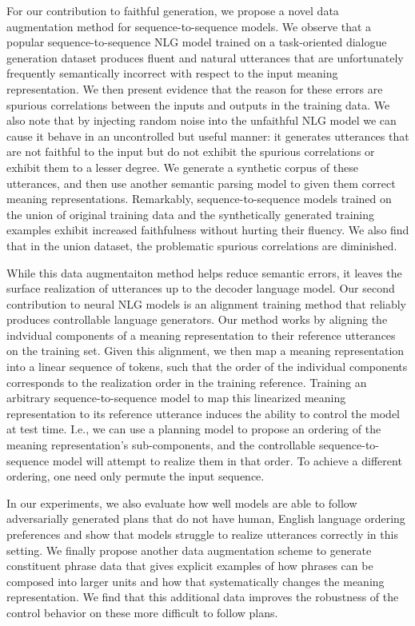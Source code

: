       
For our contribution to faithful generation, we propose a novel data
augmentation method for sequence-to-sequence models.  We observe that a
popular sequence-to-sequence NLG model trained on a task-oriented dialogue
generation dataset produces fluent and natural utterances that are
unfortunately frequently semantically incorrect with respect to the input
meaning representation.  We then present evidence that the reason for these
errors are spurious correlations between the inputs and outputs in the
training data.  We also note that by injecting random noise into the
unfaithful NLG model we can cause it behave in an uncontrolled but useful
manner: it generates utterances that are not faithful to the input but do not
exhibit the spurious correlations or exhibit them to a lesser degree.  We
generate a synthetic corpus of these utterances, and then use another semantic
parsing model to given them correct meaning representations.  Remarkably,
sequence-to-sequence models trained on the union of original training data and
the synthetically generated training examples exhibit increased faithfulness
without hurting their fluency. We also find that in the union dataset, 
the problematic spurious correlations are diminished.

While this data augmentaiton method helps reduce semantic errors, it leaves the surface
realization of utterances up to the decoder language model. 
Our second contribution to neural NLG models is an alignment training method
that reliably produces controllable language generators. Our method works
by aligning the indvidual components of a meaning representation to their
reference utterances on the training set. Given this alignment, we then
map a meaning representation into a linear sequence of tokens, such that 
the order of the individual components corresponds to the realization order
in the training reference. Training an arbitrary sequence-to-sequence model
to map this linearized meaning representation to its reference utterance induces 
the ability to control the model at test time. I.e., we can use a planning
model to propose an ordering of the meaning representation's sub-components,
and the controllable sequence-to-sequence model will attempt to 
realize them in that order.
To achieve a different ordering, one need only permute the input sequence.

In our experiments, we also evaluate how well models are able to follow 
adversarially generated plans that do not have human, English language ordering
preferences and show that models struggle to realize utterances correctly in
this setting. We finally propose another data augmentation scheme to 
generate constituent phrase data that gives explicit examples of how
phrases can be composed into larger units and how that systematically
changes the meaning representation. We find that this additional data
improves the robustness of the control behavior on these more difficult to
follow plans.


